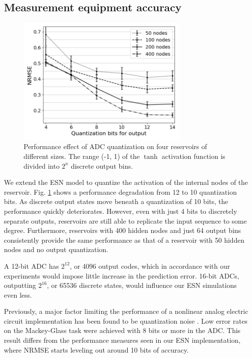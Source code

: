 \subsection{Measurement equipment accuracy}

\begin{figure}[t!]
  \centering
  \includegraphics[width=3.3in]{img/adc_quantization.png}
  \caption{
    Performance effect of ADC quantization on four reservoirs of different
sizes. The range (-1, 1) of the $\tanh$ activation function is divided into
$2^n$ discrete output bins.
  }
  \label{adc_quantization}
\end{figure}

We extend the ESN model to quantize the activation of the internal nodes of the
reservoir. Fig. \ref{adc_quantization} shows a performance degradation from 12
to 10 quantization bits. As discrete output states move beneath a quantization
of 10 bits, the performance quickly deteriorates. However, even with just 4 bits
to discretely separate outputs, reservoirs are still able to replicate the input
sequence to some degree. Furthermore, reservoirs with 400 hidden nodes and just
64 output bins consistently provide the same performance as that of a reservoir
with 50 hidden nodes and no output quantization.

A 12-bit ADC has $2^{12}$, or 4096 output codes, which in accordance with our
experiments would impose little increase in the prediction error. 16-bit ADCs,
outputting $2^{16}$, or 65536 discrete states, would influence our ESN
simulations even less.

Previously, a major factor limiting the performance of a nonlinear analog
electric circuit implementation has been found to be quantization noise
\cite{soriano_delay-based_2015}. Low error rates on the Mackey-Glass task were
achieved with 8 bits or more in the ADC. This result differs from the
performance measures seen in our ESN implementation, where NRMSE starts leveling
out around 10 bits of accuracy.

